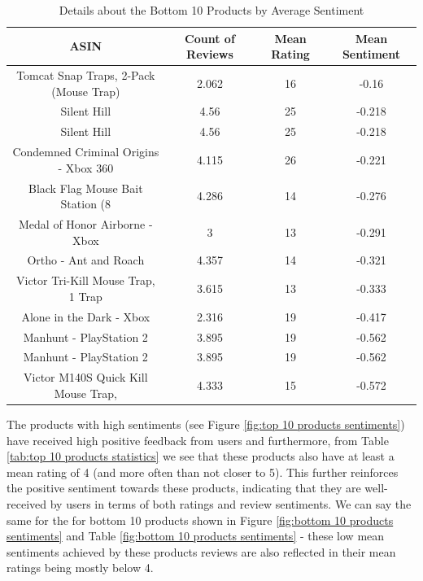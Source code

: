 \begin{table}[h]
  \centering
  \begin{tabular}{cccc}
      \hline
      \textbf{ASIN} & \textbf{Count of Reviews} & \textbf{Mean Rating} & \textbf{Mean Sentiment} \\
      \hline
      Tomcat Snap Traps, 2-Pack (Mouse Trap) &         2.062 &      16 &       -0.16  \\
      Silent Hill                            &         4.56  &      25 &       -0.218 \\
      Silent Hill                            &         4.56  &      25 &       -0.218 \\
      Condemned Criminal Origins - Xbox 360  &         4.115 &      26 &       -0.221 \\
      Black Flag Mouse Bait Station (8       &         4.286 &      14 &       -0.276 \\
      Medal of Honor Airborne - Xbox         &         3     &      13 &       -0.291 \\
      Ortho - Ant and Roach                  &         4.357 &      14 &       -0.321 \\
      Victor Tri-Kill Mouse Trap, 1 Trap     &         3.615 &      13 &       -0.333 \\
      Alone in the Dark - Xbox               &         2.316 &      19 &       -0.417 \\
      Manhunt - PlayStation 2                &         3.895 &      19 &       -0.562 \\
      Manhunt - PlayStation 2                &         3.895 &      19 &       -0.562 \\
      Victor M140S Quick Kill Mouse Trap,    &         4.333 &      15 &       -0.572 \\
           \hline
  \end{tabular}
  \caption{Details about the Bottom 10 Products by Average Sentiment}
  \label{tab:bottom 10 products statistics}
\end{table}

The products with high sentiments (see Figure \ref{fig:top 10 products sentiments}) have received high positive feedback from users and furthermore, from Table \ref{tab:top 10 products statistics} we see that these products also have at least a mean rating of 4 (and more often than not closer to 5). This further reinforces the positive sentiment towards these products, indicating that they are well-received by users in terms of both ratings and review sentiments. We can say the same for the for bottom 10 products shown in Figure \ref{fig:bottom 10 products sentiments}  and Table \ref{fig:bottom 10 products sentiments} - these low mean sentiments achieved by these products reviews are also reflected in their mean ratings being mostly below 4.

